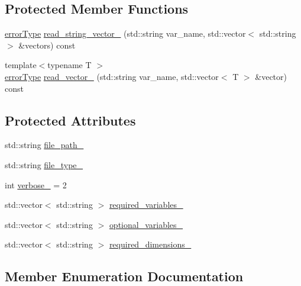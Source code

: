 \subsection*{Protected Member Functions}
\begin{DoxyCompactItemize}
\item 
\mbox{\hyperlink{class_an_en_i_o_aa56bc1ec6610b86db4349bce20f9ead0}{error\+Type}} \mbox{\hyperlink{class_an_en_i_o_a17e7a4c520675c23b01cbd65c7ffe1d5}{read\+\_\+string\+\_\+vector\+\_\+}} (std\+::string var\+\_\+name, std\+::vector$<$ std\+::string $>$ \&vectors) const
\item 
{\footnotesize template$<$typename T $>$ }\\\mbox{\hyperlink{class_an_en_i_o_aa56bc1ec6610b86db4349bce20f9ead0}{error\+Type}} \mbox{\hyperlink{class_an_en_i_o_a3c3a3f86f90ea7610e086d371414d54f}{read\+\_\+vector\+\_\+}} (std\+::string var\+\_\+name, std\+::vector$<$ T $>$ \&vector) const
\end{DoxyCompactItemize}
\subsection*{Protected Attributes}
\begin{DoxyCompactItemize}
\item 
std\+::string \mbox{\hyperlink{class_an_en_i_o_ab892e06ca18be5e0c442c9e882e4475f}{file\+\_\+path\+\_\+}}
\item 
std\+::string \mbox{\hyperlink{class_an_en_i_o_addbfb455f641a394c14907163874d8fe}{file\+\_\+type\+\_\+}}
\item 
int \mbox{\hyperlink{class_an_en_i_o_a4f6abd007730e4a8f54d57cc3572bd9e}{verbose\+\_\+}} = 2
\item 
std\+::vector$<$ std\+::string $>$ \mbox{\hyperlink{class_an_en_i_o_a119dcb81d3811547f0e37d6c3752f0a7}{required\+\_\+variables\+\_\+}}
\item 
std\+::vector$<$ std\+::string $>$ \mbox{\hyperlink{class_an_en_i_o_a43f82ffbafbbda7ab8c9471d0bce70df}{optional\+\_\+variables\+\_\+}}
\item 
std\+::vector$<$ std\+::string $>$ \mbox{\hyperlink{class_an_en_i_o_adf42061631c78508bde00de7d22a65b4}{required\+\_\+dimensions\+\_\+}}
\end{DoxyCompactItemize}


\subsection{Member Enumeration Documentation}
\mbox{\label{class_an_en_i_o_aa56bc1ec6610b86db4349bce20f9ead0}} 
